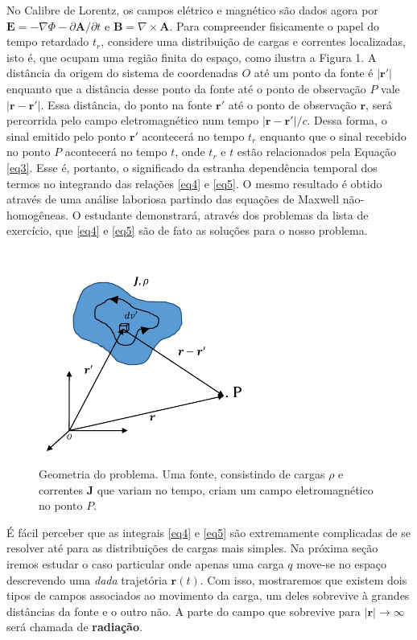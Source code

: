 \documentclass{article}
\begin{document}
No Calibre de Lorentz, os campos elétrico e magnético são dados agora por $\mathbf{E} = -\nabla\Phi - \partial \mathbf{A}/\partial t$ e $\mathbf{B} = \nabla\times\mathbf{A}$. Para compreender fisicamente o papel do tempo retardado $t_r$, considere uma distribuição de cargas e correntes localizadas, isto é, que ocupam uma região finita do espaço, como ilustra a Figura 1. A distância da origem do sistema de coordenadas $O$ até um ponto da fonte é $|\mathbf{r}'|$ enquanto que a distância desse ponto da fonte até o ponto de observação $P$ vale $|\mathbf{r}-\mathbf{r}'|$. Essa distância, do ponto na fonte $\mathbf{r}'$ até o ponto de observação $\mathbf{r}$, será percorrida pelo campo eletromagnético num tempo $|\mathbf{r}-\mathbf{r}'|/c$. Dessa forma, o sinal emitido pelo ponto $\mathbf{r}'$ acontecerá no tempo $t_r$ enquanto que o sinal recebido no ponto $P$ acontecerá no tempo $t$, onde $t_r$ e $t$ estão relacionados pela Equação \eqref{eq3}. Esse é, portanto, o significado da estranha dependência temporal dos termos no integrando das relações \eqref{eq4} e \eqref{eq5}. O mesmo resultado é obtido através de uma análise laboriosa partindo das equações de Maxwell não-homogêneas. O estudante demonstrará, através dos problemas da lista de exercício, que \eqref{eq4} e \eqref{eq5} são de fato as soluções para o nosso problema.

\begin{figure}[ht]
\centering
\includegraphics[width=7cm]{fig1.pdf}
\caption{Geometria do problema. Uma fonte, consistindo de cargas $\rho$ e correntes $\mathbf{J}$ que variam no tempo, criam um campo eletromagnético no ponto $P$.}
\end{figure}

É fácil perceber que as integrais \eqref{eq4} e \eqref{eq5} são extremamente complicadas de se resolver até para as distribuições de cargas mais simples. Na próxima seção iremos estudar o caso particular onde apenas uma carga $q$ move-se no espaço descrevendo uma \textit{dada} trajetória $\mathbf{r}(t)$. Com isso, mostraremos que existem dois tipos de campos associados ao movimento da carga, um deles sobrevive à grandes distâncias da fonte e o outro não. A parte do campo que sobrevive para $|\mathbf{r}|\rightarrow\infty$ será chamada de \textbf{radiação}.
\end{document}
